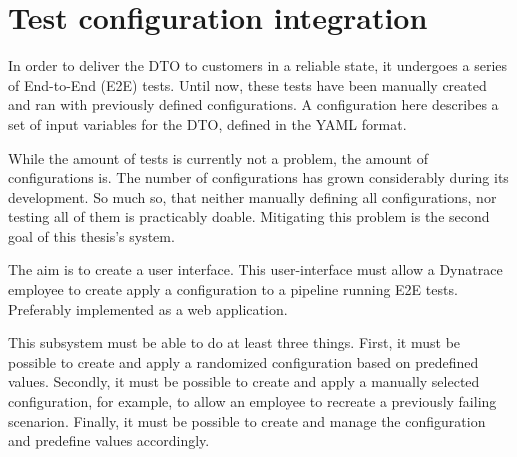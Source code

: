 \section{Test configuration integration}
\label{sec:introduction:test-configuration-integration}

In order to deliver the DTO to customers in a reliable state, it undergoes a series of End-to-End (E2E) tests.
Until now, these tests have been manually created and ran with previously defined configurations.
A configuration here describes a set of input variables for the DTO, defined in the YAML format.

While the amount of tests is currently not a problem, the amount of configurations is.
The number of configurations has grown considerably during its development.
So much so, that neither manually defining all configurations, nor testing all of them is practicably doable.
Mitigating this problem is the second goal of this thesis's system.

The aim is to create a user interface.
This user-interface must allow a Dynatrace employee to create apply a configuration to a pipeline running E2E tests.
Preferably implemented as a web application.

This subsystem must be able to do at least three things.
First, it must be possible to create and apply a randomized configuration based on predefined values.
Secondly, it must be possible to create and apply a manually selected configuration, for example, to allow an employee to recreate a previously failing scenarion.
Finally, it must be possible to create and manage the configuration and predefine values accordingly.



